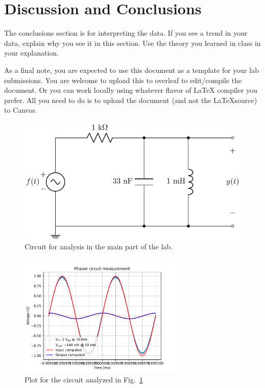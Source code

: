\documentclass[11pt]{texMemo-gibbons}
\begin{document}
\section{Discussion and Conclusions}
\label{sec:conclusions}

The conclusions section is for interpreting the data.
If you see a trend in your data, explain why you see
it in this section.  Use the theory you learned in class
in your explanation.

As a final note, you are expected to use this document
as a template for your lab submissions.  You are welcome
to upload this to overleaf to edit/compile the document.
Or you can work locally using whatever flavor of \LaTeX
compiler you prefer.  All you need to do is to upload
the document (and not the \LaTeX  source) to Canvas.

\clearpage

\begin{figure}[h!]
  \centering
  \includegraphics{circuits/circuit_01.pdf}
  \caption{Circuit for analysis in the main part of the lab.}
  \label{fig:plots01}
\end{figure}

\begin{figure}[h!]
  \centering
  \includegraphics[width=0.7\textwidth]{plots/circuit_analysis.pdf}
  \caption{Plot for the circuit analyzed in Fig.~\ref{fig:plots01}}
\end{figure}
\end{document}
